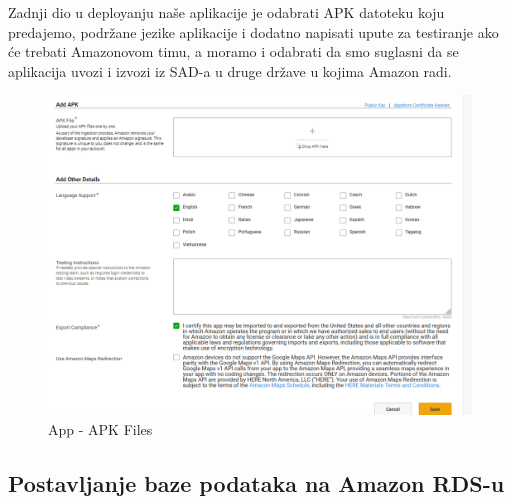   	Zadnji dio u deployanju naše aplikacije je odabrati APK datoteku koju\\ predajemo, podržane jezike aplikacije i dodatno napisati upute za testiranje ako će trebati Amazonovom timu, a moramo i odabrati da smo suglasni da se aplikacija uvozi i izvozi iz SAD-a u druge države u kojima Amazon radi.
  		 \begin{figure}[H]
  		\centering
  		\includegraphics[scale=0.55]{./slike/amzn6.png}
  		\caption{App - APK Files}
  		\label{fig:amzn6}
  	\end{figure} \eject
  
  \subsection{Postavljanje baze podataka na Amazon RDS-u}
 
